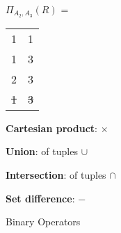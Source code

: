 \documentclass{article}
\begin{document}
\begin{outline}
\begin{example}
\begin{table}[!htb]
\begin{minipage}{.5\linewidth}
\begin{tabular}{|c|c|c|c|}
\end{tabular}
    \end{minipage}%
    \begin{minipage}{.5\linewidth}
      \centering
     $\Pi_{A_2, A_3}(R)$ =    \begin{tabular}{|c|c|}
   \hline
   \cellcolor{excel}{$A_2$}  &   \cellcolor{excel}{$A_3$}  \\
  \hline
   1 & 1 \\
      \hline
  1 & 3  \\
      \hline
  2 & 3  \\
      \hline
 \st{ 1 } & \st{ 3 }   \\
      \hline
   
\end{tabular}
    \end{minipage} 
\end{table}



 


\end{example}
        
        
        
        
        
        
        
        
        
        
        
        
        
        \1 \textbf{Cartesian product}: $\times$
        
        
        
        
        \1 \textbf{Union}: of tuples $\cup$
        
        
        
        \1 \textbf{Intersection}: of tuples $\cap$
        
        
        \1 \textbf{Set difference}: $-$ %
        
        
        
       
  \end{outline}
  
  
  
  
  Binary Operators
  \begin{outline}
        
  \end{outline}
  
\end{document}
